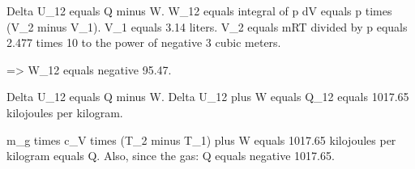 Delta U_12 equals Q minus W.  
W_12 equals integral of p dV equals p times (V_2 minus V_1).  
V_1 equals 3.14 liters.  
V_2 equals mRT divided by p equals 2.477 times 10 to the power of negative 3 cubic meters.  

=> W_12 equals negative 95.47.  

Delta U_12 equals Q minus W.  
Delta U_12 plus W equals Q_12 equals 1017.65 kilojoules per kilogram.  

m_g times c_V times (T_2 minus T_1) plus W equals 1017.65 kilojoules per kilogram equals Q.  
Also, since the gas:  
Q equals negative 1017.65.